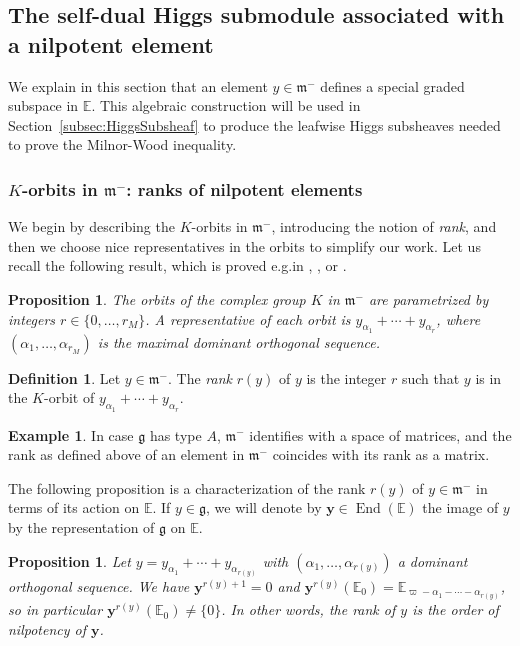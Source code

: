 \documentclass[10pt]{amsart}
\newcommand{\citestar}[3]{\cite[#3]{#1}}
\theoremstyle{plain}
\newtheorem{prop}[theo]{Proposition}
\theoremstyle{definition}
\newtheorem{defi}[theo]{Definition}
\newtheorem{exem}[theo]{Example}
\DeclareMathOperator{\End}{End}
\newcommand{\bE}{\mathbb{E}}
\newcommand{\by}{\boldsymbol{y}}
\newcommand{\fgg}{\mathfrak{g}}
\newcommand{\fm}{\mathfrak{m}}
\newcommand{\rkm}{{r_M}}
\newcommand{\rky}{{r(y)}}
\providecommand{\eg}{e.g.}\providecommand{\ie}{i.e.}\providecommand{\etc}{etc.}\providecommand{\resp}{resp.}\providecommand{\cf}{cf.}
\let\Subsection\subsection\let\Subsubsection\subsubsection
\begin{document}
\Subsection{The self-dual Higgs submodule associated with a nilpotent element}
\label{subsec:higgs-submodule}

We explain in this section that an element $y\in\fm^-$ defines a special graded subspace in
$\bE$. This algebraic construction will be used in Section~\ref{subsec:HiggsSubsheaf} to produce
the leafwise Higgs subsheaves needed to prove the Milnor-Wood inequality.

\subsubsection{$K$-orbits in $\fm^-$: ranks of nilpotent elements}\label{subsubsec:rank}

We begin by describing the $K$\nobreakdash-orbits in $\fm^-$, introducing the notion of \emph{rank}, and then we
choose nice representatives in the orbits to simplify our work. Let us recall the following result, which is proved \eg in
\cite{Harish}, \hbox{\citestar{Helgason}*{Ch.\,VIII,\,}}, or \cite{WolfFineStructure}.

\begin{prop}
\label{prop:rank}
The orbits of the complex group $K$ in $\fm^-$ are parametrized by integers $r \in \{0,\ldots,\rkm\}$.
A representative of each orbit is $y_{\alpha_1} + \cdots + y_{\alpha_r}$, where $(\alpha_1,\ldots,\alpha_{r_M})$ is
the maximal dominant orthogonal sequence.
\end{prop}

\begin{defi}\label{defi:rank}
Let $y\in\fm^-$. The \emph{rank} $\rky$ of $y$ is the integer $r$ such that $y$ is in the $K$-orbit
of $y_{\alpha_1} + \cdots + y_{\alpha_r}$.
\end{defi}

\begin{exem}
\label{exem:matrices}
In case $\fgg$ has type $A$, $\fm^-$ identifies with a space of matrices, and
the rank as defined above of an element in $\fm^-$ coincides with its rank as a matrix.
\end{exem}

The following proposition is a characterization of the rank $\rky$ of $y\in\fm^-$ in terms
of its action on $\bE$. If $y\in\fgg$, we will denote by $\by\in\End(\bE)$ the image of $y$ by the
representation of $\fgg$ on $\bE$.

\begin{prop}
\label{prop:rang-y}
Let $y = y_{\alpha_1} + \cdots + y_{\alpha_\rky}$ with $(\alpha_1,\ldots,\alpha_\rky)$ a
dominant orthogonal sequence.
We have $\by^{\rky+1}=0$ and $\by^\rky(\bE_{0}) = \bE_{\varpi-\alpha_1-\cdots-\alpha_\rky}$, so
in particular $\by^\rky(\bE_{0}) \neq \{ 0 \}$.
In other words, the rank of $y$ is the order of nilpotency of $\by$.
\end{prop}
\end{document}
